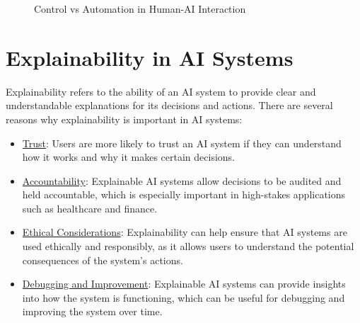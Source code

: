 \begin{figure}
    \caption{Control vs Automation in Human-AI Interaction}
    \label{fig:control-automation}
\end{figure}

\section{Explainability in AI Systems}

Explainability refers to the ability of an AI system to provide clear and understandable explanations for its decisions and actions. There are several reasons why explainability is important in AI systems:
\begin{itemize}
    \item \ul{Trust}: Users are more likely to trust an AI system if they can understand how it works and why it makes certain decisions.
    \item \ul{Accountability}: Explainable AI systems allow decisions to be audited and held accountable, which is especially important in high-stakes applications such as healthcare and finance.
    \item \ul{Ethical Considerations}: Explainability can help ensure that AI systems are used ethically and responsibly, as it allows users to understand the potential consequences of the system's actions.
    \item \ul{Debugging and Improvement}: Explainable AI systems can provide insights into how the system is functioning, which can be useful for debugging and improving the system over time.
\end{itemize}

